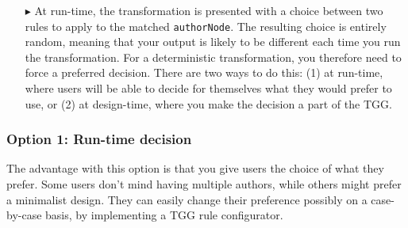 \begin{itemize}
\vspace{0.5cm}

\item[$\blacktriangleright$] At run-time, the transformation is presented with a choice between two rules to apply to the matched \texttt{authorNode}. The
resulting choice is entirely random, meaning that your output is likely to be different each time you run the transformation. For a deterministic
transformation, you therefore need to force a preferred decision. There are two ways to do this: (1) at run-time, where users will be able to decide for
themselves what they would prefer to use, or (2) at design-time, where you make the decision a part of the TGG.

\vfill

\end{itemize}

\subsubsection{Option 1: Run-time decision}

The advantage with this option is that you give users the choice of what they prefer. Some users don't mind having multiple authors, while others might prefer a
minimalist design. They can easily change their preference possibly on a case-by-case basis, by implementing a TGG rule configurator.

